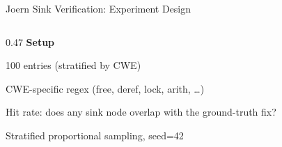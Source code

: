 \documentclass[aspectratio=169,10pt]{beamer}
\begin{document}
\begin{frame}{Joern Sink Verification: Experiment Design}
\begin{columns}[T]
\begin{column}{0.47\textwidth}
  \vspace{0.4em}
  \textbf{Setup}
  \begin{description}
    \item[\textbf{N}] 100 entries (stratified by CWE)
    \item[\textbf{Patterns}] CWE-specific regex (free, deref, lock, arith, \ldots)
    \item[\textbf{Metric}] Hit rate: does any sink node overlap with the ground-truth fix?
  \end{description}

  \vspace{0.3em}
  {\scriptsize Stratified proportional sampling, seed=42}

\end{column}
\end{columns}
\end{frame}
\end{document}
